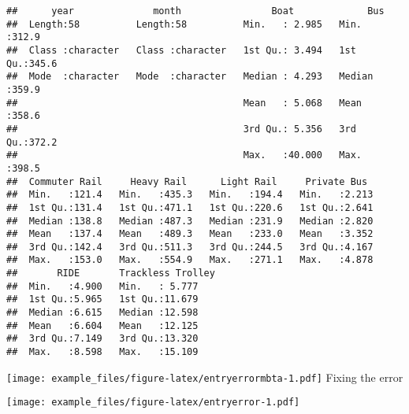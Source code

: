 \documentclass[]{article}
\newenvironment{Shaded}{\begin{snugshade}}{\end{snugshade}}
\newcommand{\DecValTok}[1]{\textcolor[rgb]{0.00,0.00,0.81}{#1}}
\newcommand{\KeywordTok}[1]{\textcolor[rgb]{0.13,0.29,0.53}{\textbf{#1}}}
\newcommand{\NormalTok}[1]{#1}
\newcommand{\OperatorTok}[1]{\textcolor[rgb]{0.81,0.36,0.00}{\textbf{#1}}}
\newcommand{\StringTok}[1]{\textcolor[rgb]{0.31,0.60,0.02}{#1}}
\begin{document}
\begin{verbatim}
##      year              month                Boat             Bus       
##  Length:58          Length:58          Min.   : 2.985   Min.   :312.9  
##  Class :character   Class :character   1st Qu.: 3.494   1st Qu.:345.6  
##  Mode  :character   Mode  :character   Median : 4.293   Median :359.9  
##                                        Mean   : 5.068   Mean   :358.6  
##                                        3rd Qu.: 5.356   3rd Qu.:372.2  
##                                        Max.   :40.000   Max.   :398.5  
##  Commuter Rail     Heavy Rail      Light Rail     Private Bus   
##  Min.   :121.4   Min.   :435.3   Min.   :194.4   Min.   :2.213  
##  1st Qu.:131.4   1st Qu.:471.1   1st Qu.:220.6   1st Qu.:2.641  
##  Median :138.8   Median :487.3   Median :231.9   Median :2.820  
##  Mean   :137.4   Mean   :489.3   Mean   :233.0   Mean   :3.352  
##  3rd Qu.:142.4   3rd Qu.:511.3   3rd Qu.:244.5   3rd Qu.:4.167  
##  Max.   :153.0   Max.   :554.9   Max.   :271.1   Max.   :4.878  
##       RIDE       Trackless Trolley
##  Min.   :4.900   Min.   : 5.777   
##  1st Qu.:5.965   1st Qu.:11.679   
##  Median :6.615   Median :12.598   
##  Mean   :6.604   Mean   :12.125   
##  3rd Qu.:7.149   3rd Qu.:13.320   
##  Max.   :8.598   Max.   :15.109
\end{verbatim}

\begin{Shaded}
\end{Shaded}

\texttt{[image: example\_files/figure-latex/entryerrormbta-1.pdf]} Fixing
the error

\begin{Shaded}
\end{Shaded}

\texttt{[image: example\_files/figure-latex/entryerror-1.pdf]}
\end{document}

